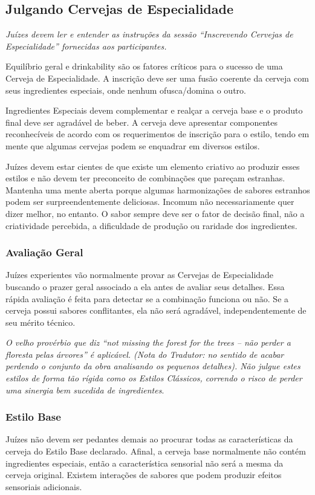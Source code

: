 \subsection*{Julgando Cervejas de Especialidade}
\textit{Juízes devem ler e entender as instruções da sessão “Inscrevendo Cervejas de Especialidade” fornecidas aos participantes.}

Equilíbrio geral e drinkability são os fatores críticos para o sucesso de uma Cerveja de Especialidade. A inscrição deve ser uma fusão coerente da cerveja com seus ingredientes especiais, onde nenhum ofusca/domina o outro.

Ingredientes Especiais devem complementar e realçar a cerveja base e o produto final deve ser agradável de beber. A cerveja deve apresentar componentes reconhecíveis de acordo com os requerimentos de inscrição para o estilo, tendo em mente que algumas cervejas podem se enquadrar em diversos estilos.

Juízes devem estar cientes de que existe um elemento criativo ao produzir esses estilos e não devem ter preconceito de combinações que pareçam estranhas. Mantenha uma mente aberta porque algumas harmonizações de sabores estranhos podem ser surpreendentemente deliciosas. Incomum não necessariamente quer dizer melhor, no entanto. O sabor sempre deve ser o fator de decisão final, não a criatividade percebida, a dificuldade de produção ou raridade dos ingredientes.

\subsubsection*{Avaliação Geral}
Juízes experientes vão normalmente provar as Cervejas de Especialidade buscando o prazer geral associado a ela antes de avaliar seus detalhes. Essa rápida avaliação é feita para detectar se a combinação funciona ou não. Se a cerveja possui sabores conflitantes, ela não será agradável, independentemente de seu mérito técnico.

\textit{O velho provérbio que diz “not missing the forest for the trees – não perder a floresta pelas árvores” é aplicável. (Nota do Tradutor: no sentido de acabar perdendo o conjunto da obra analisando os pequenos detalhes). Não julgue estes estilos de forma tão rígida como os Estilos Clássicos, correndo o risco de perder uma sinergia bem sucedida de ingredientes}.

\subsubsection*{Estilo Base}
Juízes não devem ser pedantes demais ao procurar todas as características da cerveja do Estilo Base declarado. Afinal, a cerveja base normalmente não contém ingredientes especiais, então a característica sensorial não será a mesma da cerveja original. Existem interações de sabores que podem produzir efeitos sensoriais adicionais.

